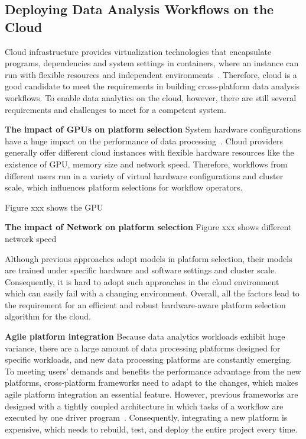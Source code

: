 \subsection{Deploying Data Analysis Workflows on the Cloud}

Cloud infrastructure provides virtualization technologies that encapsulate programs, dependencies and system settings in containers, where an instance can run with flexible resources and independent environments~\cite{wang2017myria}.
Therefore, cloud is a good candidate to meet the requirements in building cross-platform data analysis workflows.
To enable data analytics on the cloud, however, there are still several requirements and challenges to meet for a competent system.

\textbf{The impact of GPUs on platform selection} 
System hardware configurations have a huge impact on the performance of data processing~\cite{mattson2019mlperf}.
Cloud providers generally offer different cloud instances with flexible hardware resources like the existence of GPU, memory size and network speed.
Therefore, workflows from different users run in a variety of virtual hardware configurations and cluster scale, which influences platform selections for workflow operators. 

Figure xxx shows the GPU


\textbf{The impact of Network on platform selection}
Figure xxx shows different network speed

Although previous approaches adopt models in platform selection, their models are trained under specific hardware and software settings and cluster scale.
Consequently, it is hard to adopt such approaches in the cloud environment which can easily fail with a changing environment.
Overall, all the factors lead to the requirement for an efficient and robust hardware-aware platform selection algorithm for the cloud.


\textbf{Agile platform integration} Because data analytics workloads exhibit huge variance, there are a large amount of data processing platforms designed for specific workloads, and new data processing platforms are constantly emerging. 
To meeting users' demands and benefits the performance advantage from the new platforms, cross-platform frameworks need to adapt to the changes, which makes agile platform integration an essential feature. 
However, previous frameworks are designed with a tightly coupled architecture in which tasks of a workflow are executed by one driver program~\cite{balalaie2015migrating}. Consequently, integrating a new platform is expensive, which needs to rebuild, test, and deploy the entire project every time. 

